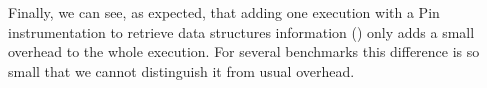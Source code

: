 Finally, we can see, as expected, that adding one execution with a Pin
instrumentation to retrieve data structures information (\MocaPin) only adds a small overhead
to the whole \Moca execution. For several benchmarks this difference is so small that we cannot
distinguish it from \Moca usual overhead.


